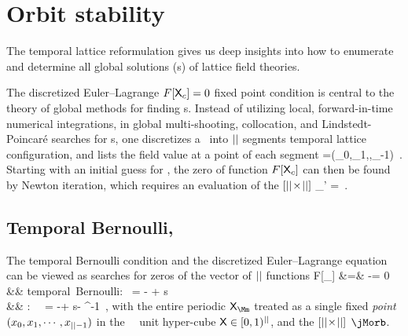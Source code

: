 
\section{Orbit stability}
\label{s:JacobianOrb}

The {temporal lattice} reformulation gives us deep insights into how to
enumerate and determine all global solutions ({\lattstate}s) of
lattice field theories.

The discretized Euler–\-Lagrange
$F[\mathsf{X}_c]=0$ fixed point condition  is central to the
theory of {global methods} for finding {\po}s. Instead of
utilizing local, for\-ward-in-time numerical integrations, in
global multi-shooting,
collocation, and Lindstedt-Poincar{\'e}
searches for \po s, one discretizes a \po\ into ${||}$
segments temporal lattice
configuration,
and lists the field value at a point of each segment
\beq
\transp{\Xx}=(\ssp_0,\ssp_{1},\cdots,\ssp_{\cl{}-1})
\,.
Starting with an initial guess for \Xx, the zero of function
$F[\mathsf{X}_c]$ can then be found by Newton iteration, which requires
an evaluation of the $[{||}\!\times\!{||}]$ \emph{\jacobianOrb}
\beq
\jMorb_{\zeit\zeit'} =
\,.

\subsection{Temporal Bernoulli, {\templatt}} %
\label{s:JacobianOrbBern}

The {temporal Bernoulli} condition
 and
the
{\templatt} discretized Euler–\-Lagrange equation 
can be viewed as searches for zeros of the vector of
${||}$ functions
\bea
F[\Xx_\Mm] &=& \jMorb\Xx-\Mm = 0
                \label{tempFixPoint}\\
&& \mbox{temporal Bernoulli: } \qquad \jMorb =  - {\shift} + {s}\id
                \label{bernFixPoint}\\
&& \mbox{\templatt: } \qquad\qquad\;\;\,    \jMorb =  -\shift + s\id - \shift^{-1}
                \label{tempCatFix}
\,,
\eea
with the entire periodic \emph{{\lattstate}} ${\Xx}_{\Mm}$ treated as a
single fixed \emph{point} $(x_0,x_{1},\cdots,x_{{||}-1})$ in the
\cl{}\dmn\ \statesp\ unit hyper-cube $\mathsf{X}\in[0,1)^{||}$, and
the $[{||}\!\times\!{||}]$ {\jacobianOrb}  $\jMorb$.

